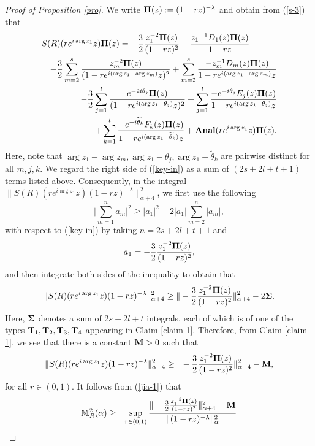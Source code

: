 \documentclass[10pt]{amsart}
\theoremstyle{definition}    %
\numberwithin{equation}{section}
\begin{document}
\begin{proof}[Proof of Proposition \ref{pro}]
We write ${\bf\Pi}(z):=(1-rz)^{-\lambda}$ and obtain from (\ref{s-3}) that 
\begin{eqnarray}\label{key-in}
\lefteqn{S(R)(re^{i\arg z_1}z){\bf\Pi}(z)=-\frac{3}{2}\frac{z_1^{-2}{\bf\Pi}(z)}{(1-rz)^2}-\frac{{z_1}^{-1}D_1(z){\bf\Pi}(z)}{1-rz}} \\
&& -\frac{3}{2}\sum_{m=2}^{s}\frac{z_m^{-2}{\bf\Pi}(z)}{(1-re^{i(\arg z_1-\arg z_m)}z)^2}+\sum_{m=2}^{s}\frac{-z_m^{-1}D_m(z){\bf\Pi}(z)}{1-re^{i(\arg z_1-\arg z_m)}z}\nonumber
\\
&&-\frac{3}{2}\sum_{j=1}^{l}\frac{e^{-2i\theta_j}{\bf\Pi}(z)}{(1-re^{i(\arg z_1-\theta_j)}z)^2}+\sum_{j=1}^{l}\frac{-e^{-i\theta_j}E_j(z){\bf\Pi}(z)}{1-re^{i(\arg z_1-\theta_j)}z}\nonumber \\
&&+\sum_{k=1}^{t} \frac{-e^{-i\widetilde{\theta}_k}F_k(z){\bf\Pi}(z)}{1-re^{i(\arg z_1-\widetilde{\theta}_k)}z}+{\bf Anal}(re^{i\arg z_1}z){\bf\Pi}(z).\nonumber
\end{eqnarray}
Here, note that $\arg z_1-\arg z_m, \arg z_1-\theta_j, \arg z_1-\widetilde{\theta}_k$ are pairwise distinct for all $m,j,k$. We regard the right side of (\ref{key-in}) as a sum of $(2s+2l+t+1)$ terms listed above. Consequently, in the integral $\|S(R)(re^{i\arg z_1}z)(1-rz)^{-\lambda}\|_{\alpha+4}^2$, we first use the following 
$$\Big|\sum_{m=1}^{n}a_m\Big|^2\geq |a_1|^2-2|a_1|\sum_{m=2}^{n}|a_m|,$$
with respect to (\ref{key-in}) by taking $n=2s+2l+t+1$ and 
$$a_1=-\frac{3}{2}\frac{z_1^{-2}{\bf\Pi}(z)}{(1-rz)^2},$$
and then integrate both sides of the inequality to obtain that
\begin{eqnarray}
\|S(R)(re^{i\arg z_1}z)(1-rz)^{-\lambda}\|_{\alpha+4}^2\geq \|-\frac{3}{2}\frac{z_1^{-2}{\bf\Pi}(z)}{(1-rz)^2}\|_{\alpha+4}^2-2\bf \Sigma. \nonumber
\end{eqnarray}
Here, $\bf \Sigma$ denotes a sum of $2s+2l+t$ integrals, each of which is of one of the types ${\bf T}_{1}, {\bf T}_{2}, {\bf T}_{3}, {\bf T}_{4}$ appearing in Claim \ref{claim-1}. Therefore, from Claim \ref{claim-1}, we see that there is a constant ${\bf M}>0$ such that
\begin{eqnarray}
\|S(R)(re^{i\arg z_1}z)(1-rz)^{-\lambda}\|_{\alpha+4}^2\geq \|-\frac{3}{2}\frac{z_1^{-2}{\bf\Pi}(z)}{(1-rz)^2}\|_{\alpha+4}^2-{\bf M}, \nonumber
\end{eqnarray}
for all $r\in (0,1)$. It follows from (\ref{jia-1}) that
\begin{eqnarray}\label{jia-2}
\mathbb{M}_{R}^2(\alpha) &\geq& \sup\limits_{r\in (0,1)}\frac{\|-\frac{3}{2}\frac{z_1^{-2}{\bf\Pi}(z)}{(1-rz)^2}\|_{\alpha+4}^2-{\bf M}}{\|(1-rz)^{-\lambda}\|_{\alpha}^2} \nonumber \\

\end{eqnarray}
\end{proof}
\end{document}
